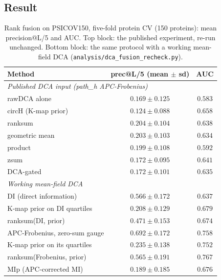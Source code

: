 \subsection{Result}
\begin{table}[ht]
	\centering
	\caption{Rank fusion on PSICOV150, five-fold protein CV (150 proteins):
		mean precision@L/5 and AUC.  Top block: the published experiment,
		re-run unchanged.  Bottom block: the same protocol with a working
		mean-field DCA (\texttt{analysis/dca\_fusion\_recheck.py}).}
	\label{tab:fusion}
	\begin{tabular}{lcc}
		\toprule
		Method                                    & prec@L/5 (mean $\pm$ sd) & AUC     \\
		\midrule
		\multicolumn{3}{l}{\emph{Published DCA input (path\_h APC-Frobenius)}}        \\
		rawDCA alone                              & $0.169 \pm 0.125$        & $0.583$ \\
		circH (K-map prior)                       & $0.124 \pm 0.088$        & $0.658$ \\
		ranksum                                   & $0.204 \pm 0.104$        & $0.638$ \\
		geometric mean                            & $0.203 \pm 0.103$        & $0.634$ \\
		product                                   & $0.199 \pm 0.108$        & $0.592$ \\
		zsum                                      & $0.172 \pm 0.095$        & $0.641$ \\
		DCA-gated                                 & $0.172 \pm 0.101$        & $0.635$ \\
		\midrule
		\multicolumn{3}{l}{\emph{Working mean-field DCA}}                            \\
		DI (direct information)                   & $0.566 \pm 0.172$        & $0.637$ \\
		\quad K-map prior on DI quartiles         & $0.208 \pm 0.129$        & $0.679$ \\
		\quad ranksum(DI, prior)                  & $0.471 \pm 0.153$        & $0.674$ \\
		APC-Frobenius, zero-sum gauge             & $\mathbf{0.692 \pm 0.172}$ & $0.758$ \\
		\quad K-map prior on its quartiles        & $0.235 \pm 0.138$        & $0.752$ \\
		\quad ranksum(Frobenius, prior)           & $0.565 \pm 0.191$        & $0.767$ \\
		\midrule
		MIp (APC-corrected MI)                    & $0.189 \pm 0.185$        & $0.676$ \\
		\bottomrule
	\end{tabular}
\end{table}

